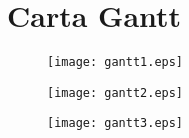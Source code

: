 \newpage
\section{Carta Gantt}
\label{appen:gantt}

%
%

\begin{figure}[H]
\centering
\texttt{[image: gantt1.eps]}
\label{fig:gantt1}
\end{figure}

\begin{figure}[htbp!]
\centering
\texttt{[image: gantt2.eps]}
\label{fig:gantt2}
\end{figure}

\begin{figure}[htbp!]
\centering
\texttt{[image: gantt3.eps]}
\label{fig:gantt3}
\end{figure}
